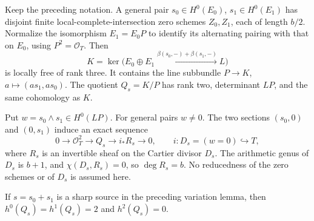 \begin{lemma}
\label{lem:DE-A3-positive-determinant-curve}
Keep the preceding notation. A general pair
$s_0\in H^0(E_0)$, $s_1\in H^0(E_1)$ has disjoint finite
local-complete-intersection zero schemes $Z_0,Z_1$, each
of length $b/2$.
Normalize the isomorphism $E_1=E_0P$ to identify its alternating
pairing with that on $E_0$, using $P^2=\mathcal O_T$.
Then
\[
 K=\ker\bigl(E_0\oplus E_1
       \xrightarrow{\beta(s_0,-)+\beta(s_1,-)}L\bigr)
\]
is locally free of rank three. It contains the line subbundle
$P\to K$, $a\mapsto(as_1,as_0)$.
The quotient $Q_s=K/P$ has rank two, determinant $LP$, and
the same cohomology as $K$.

Put $w=s_0\wedge s_1\in H^0(LP)$. For general pairs $w\ne0$.
The two sections $(s_0,0)$ and $(0,s_1)$ induce an exact sequence
\[
 0\longrightarrow\mathcal O_T^2\longrightarrow Q_s
      \longrightarrow i_*R_s\longrightarrow0,
 \qquad i:D_s=(w=0)\hookrightarrow T,
                                                        \tag{DE-TB1}
\]
where $R_s$ is an invertible sheaf on the Cartier divisor $D_s$.
The arithmetic genus of $D_s$ is $b+1$, and
$\chi(D_s,R_s)=0$, so $\deg R_s=b$.
No reducedness of the zero schemes or of $D_s$ is assumed here.

If $s=s_0+s_1$ is a sharp source in the preceding variation
lemma, then $h^0(Q_s)=h^1(Q_s)=2$ and $h^2(Q_s)=0$.
\end{lemma}
